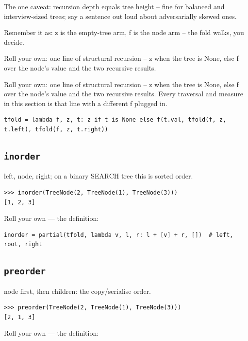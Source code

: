 \documentclass[10pt,letterpaper]{book}
\begin{document}
The one caveat: recursion depth equals tree height -- fine for balanced and interview-sized trees; say a sentence out loud about adversarially skewed ones.


Remember it as: z is the empty-tree arm, f is the node arm -- the fold walks, you decide.


Roll your own: one line of structural recursion -- z when the tree is None, else f over the node's value and the two recursive results.


Roll your own: one line of structural recursion -- z when the tree is None, else f over the node's value and the two recursive results. Every traversal and measure in this section is that line with a different f plugged in.

\begin{lstlisting}[style=ex]
tfold = lambda f, z, t: z if t is None else f(t.val, tfold(f, z, t.left), tfold(f, z, t.right))
\end{lstlisting}

\subsection{\texttt{inorder}}\label{def:inorder}
left, node, right; on a binary SEARCH tree this is sorted order.
\begin{lstlisting}[style=ex]
>>> inorder(TreeNode(2, TreeNode(1), TreeNode(3)))
[1, 2, 3]
\end{lstlisting}

Roll your own --- the definition:

\begin{lstlisting}[style=ex]
inorder = partial(tfold, lambda v, l, r: l + [v] + r, [])  # left, root, right
\end{lstlisting}

\subsection{\texttt{preorder}}\label{def:preorder}
node first, then children: the copy/serialise order.
\begin{lstlisting}[style=ex]
>>> preorder(TreeNode(2, TreeNode(1), TreeNode(3)))
[2, 1, 3]
\end{lstlisting}

Roll your own --- the definition:
\end{document}
